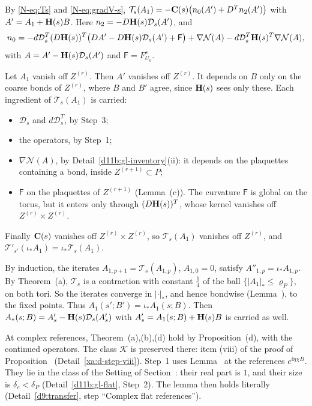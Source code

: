 \begin{step}
By \eqref{N-eq:Ts} and \eqref{N-eq:gradV-s}, $\mathcal T_s(A_1)=-\mathbf C(s)\big(n_0(A')+D^Tn_2(A')\big)$ with $A'=A_1+\mathbf H(s)B$. Here $n_2=-D\mathbf H(s)\mathcal D_s(A')$, and
\[
n_0=-d\mathcal D_s^T(D\mathbf H(s))^T\big(DA'-D\mathbf H(s)\mathcal D_s(A')+\mathsf F\big)+\nabla\mathcal N(A)-d\mathcal D_s^T\mathbf H(s)^T\nabla\mathcal N(A),
\]
with $A=A'-\mathbf H(s)\mathcal D_s(A')$ and $\mathsf F=F^s_{U_0}$.

Let $A_1$ vanish off $Z^{(r)}$. Then $A'$ vanishes off $Z^{(r)}$. It depends on $B$ only on the coarse bonds of $Z^{(r)}$, where $B$ and $B'$ agree, since $\mathbf H(s)$ sees only these. Each ingredient of $\mathcal T_s(A_1)$ is carried:
\begin{itemize}
\item $\mathcal D_s$ and $d\mathcal D_s^T$, by Step~3;
\item the operators, by Step~1;
\item $\nabla\mathcal N(A)$, by Detail~\ref{d11b:gl-inventory}(ii): it depends on the plaquettes containing a bond, inside $Z^{(r+1)}\subset P$;
\item $\mathsf F$ on the plaquettes of $Z^{(r+1)}$ (Lemma~(c)). The curvature $\mathsf F$ is global on the torus, but it enters only through $(D\mathbf H(s))^T$, whose kernel vanishes off $Z^{(r)}\times Z^{(r)}$.
\end{itemize}
Finally $\mathbf C(s)$ vanishes off $Z^{(r)}\times Z^{(r)}$, so $\mathcal T_s(A_1)$ vanishes off $Z^{(r)}$, and $\mathcal T'_{s'}(\iota_*A_1)=\iota_*\mathcal T_s(A_1)$.

By induction, the iterates $A_{1,p+1}=\mathcal T_s(A_{1,p})$, $A_{1,0}=0$, satisfy $A''_{1,p}=\iota_*A_{1,p}$. By Theorem~(a), $\mathcal T_s$ is a contraction with constant $\frac14$ of the ball $\{|A_1|_*\le\varrho_P\}$, on both tori. So the iterates converge in $|\cdot|_*$, and hence bondwise (Lemma~), to the fixed points. Thus $A_1(s';B')=\iota_*A_1(s;B)$. Then $A_*(s;B)=A'_s-\mathbf H(s)\mathcal D_s(A'_s)$ with $A'_s=A_1(s;B)+\mathbf H(s)B$ is carried as well.
\end{step}

\begin{step}
At complex references, Theorem~(a),(b),(d) hold by Proposition~(d), with the continued operators. The class $\mathcal K$ is preserved there: item (viii) of the proof of Proposition~ (Detail~\ref{xa:d-step-viii}). Step~1 uses Lemma~ at the references $e^{\ii\eta\chi B}$. They lie in the class of the Setting of Section~: their real part is $1$, and their size is $\delta_c<\delta_P$ (Detail~\ref{d11b:gl-flat}, Step~2). The lemma then holds literally (Detail~\ref{d9:transfer}, step ``Complex flat references'').
\end{step}

